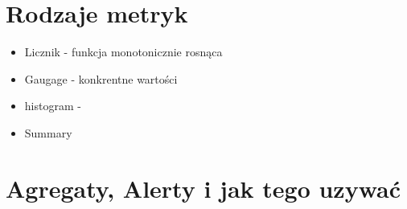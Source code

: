 \documentclass[12pt,a4paper,notitlepage,onecolumn]{article}
\begin{document}
	\section{Rodzaje metryk}
	 \begin{itemize}
	 	\item Licznik - funkcja monotonicznie rosnąca
	 	\item Gaugage - konkrentne wartości
	 	\item histogram - 
	 	\item Summary
	 \end{itemize}
	\section{Agregaty, Alerty i jak tego uzywać}
\end{document}
